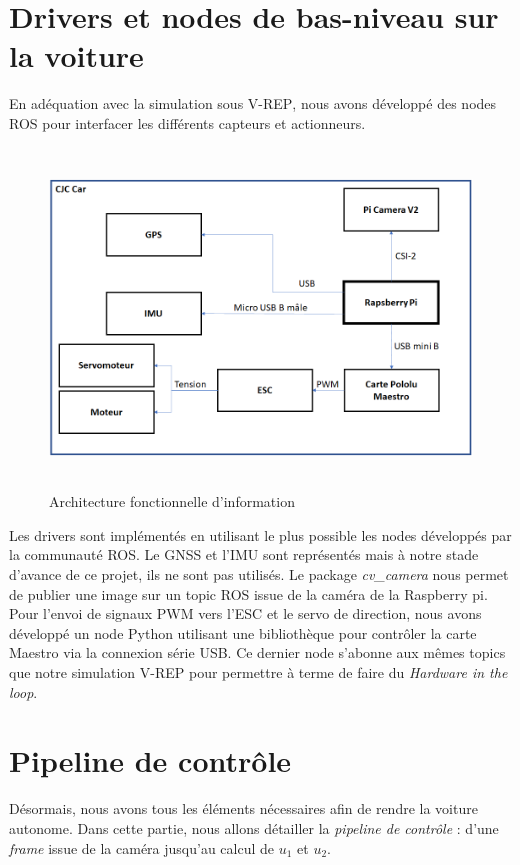 \documentclass[12pt, openany]{report}
\begin{document}
\section{Drivers et nodes de bas-niveau sur la voiture}
En adéquation avec la simulation sous \textsc{V-REP}, nous avons développé des nodes \textsc{ROS} pour interfacer les différents capteurs et actionneurs.
\begin{figure}[H]
     \centering
     \includegraphics[width=13cm, height = 9cm]{Archi fonct info.PNG}
     \caption{Architecture fonctionnelle d'information}
     \label{fig:prob}
\end{figure}
Les drivers sont implémentés en utilisant le plus possible les nodes développés par la communauté ROS. Le GNSS et l'IMU sont représentés mais à notre stade d'avance de ce projet, ils ne sont pas utilisés.
Le package \textit{cv\_camera} nous permet de publier une image sur un topic ROS issue
de la caméra de la Raspberry pi.
Pour l’envoi de signaux PWM vers l’ESC et le servo de direction, nous avons développé
un node Python utilisant une bibliothèque pour contrôler la carte Maestro via la
connexion série USB. Ce dernier node s'abonne aux mêmes topics que notre simulation \textsc{V-REP} pour permettre à terme de faire du \textit{Hardware in the loop}.



\section{Pipeline de contrôle}
Désormais, nous avons tous les éléments nécessaires afin de rendre la voiture autonome. Dans cette partie, nous allons détailler la \textit{pipeline de contrôle} : d'une \textit{frame} issue de la caméra jusqu'au calcul de $u_1$ et $u_2$.
\end{document}
